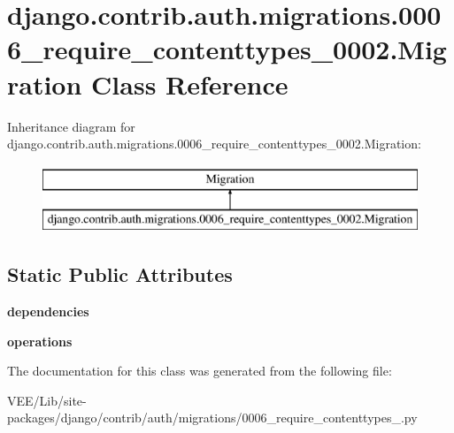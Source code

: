 \hypertarget{classdjango_1_1contrib_1_1auth_1_1migrations_1_10006__require__contenttypes__0002_1_1_migration}{}\section{django.\+contrib.\+auth.\+migrations.0006\+\_\+require\+\_\+contenttypes\+\_\+0002.Migration Class Reference}
\label{classdjango_1_1contrib_1_1auth_1_1migrations_1_10006__require__contenttypes__0002_1_1_migration}
Inheritance diagram for django.\+contrib.\+auth.\+migrations.0006\+\_\+require\+\_\+contenttypes\+\_\+0002.Migration\+:\begin{figure}[H]
\begin{center}
\leavevmode
\includegraphics[height=2.000000cm]{classdjango_1_1contrib_1_1auth_1_1migrations_1_10006__require__contenttypes__0002_1_1_migration}
\end{center}
\end{figure}
\subsection*{Static Public Attributes}
\begin{DoxyCompactItemize}
\item 
\mbox{\label{classdjango_1_1contrib_1_1auth_1_1migrations_1_10006__require__contenttypes__0002_1_1_migration_aca016f9bece23f9db88c84c6968d52dd}} 
{\bfseries dependencies}
\item 
\mbox{\label{classdjango_1_1contrib_1_1auth_1_1migrations_1_10006__require__contenttypes__0002_1_1_migration_a54db7e0188d262f4899e43e5e1b120be}} 
{\bfseries operations}
\end{DoxyCompactItemize}


The documentation for this class was generated from the following file\+:\begin{DoxyCompactItemize}
\item 
V\+E\+E/\+Lib/site-\/packages/django/contrib/auth/migrations/0006\+\_\+require\+\_\+contenttypes\+\_.\+py\end{DoxyCompactItemize}
